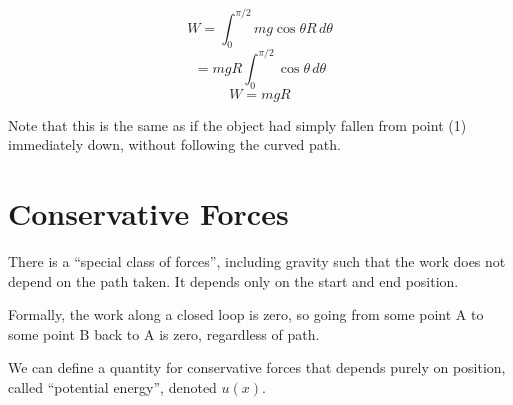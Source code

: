 \[
    W = \int_{0}^{\pi / 2} mg \cos \theta R \, d \theta
\]
\[
    = mgR \int_{0}^{\pi / 2} \cos \theta \, d\theta
\]
\[
    W = mgR
\]

Note that this is the same as if the object had simply fallen from point (1) immediately down, without following the curved path.

\section{Conservative Forces}
There is a ``special class of forces'', including gravity such that the work does not depend on the path taken. It depends only on the start and end position.

Formally, the work along a closed loop is zero, so going from some point A to some point B back to A is zero, regardless of path.

We can define a quantity for conservative forces that depends purely on position, called ``potential energy'', denoted $u(x)$.
